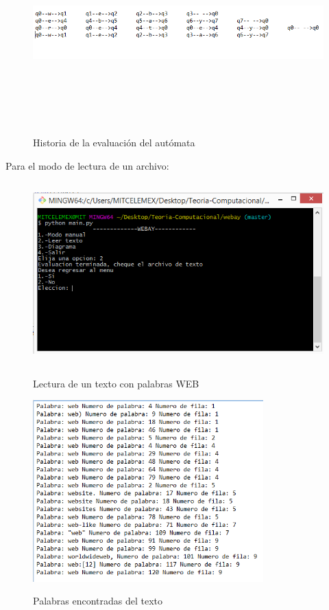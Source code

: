 \begin{figure}[H]
\includegraphics[width=\textwidth, height=7cm]{HistoriaWebay.png}
\label{fig:manualnuevoconteo_alfabeto}
\caption{Historia de la evaluaci\'on del aut\'omata}
\end{figure}

Para el modo de lectura de un archivo:\\
\begin{figure}[H]
\includegraphics[width=\textwidth, height=7cm]{ModoAutomaticoWebay.png}
\label{fig:auto_alfabeto}
\caption{Lectura de un texto con palabras WEB}
\end{figure}

\begin{figure}[H]
\includegraphics[width=\textwidth, height=7cm]{ArchivoTextoWebay.png}
\label{fig:autotexto_alfabeto}
\caption{Palabras encontradas del texto}
\end{figure}

